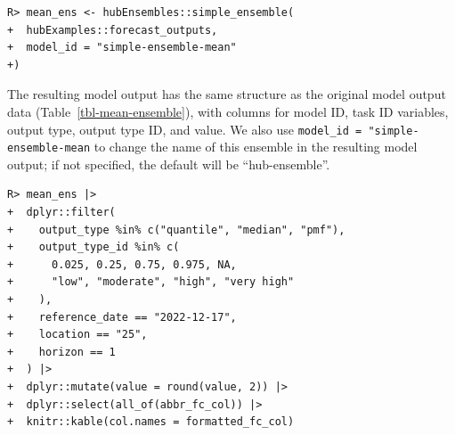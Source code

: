 \documentclass[
  article,
  shortnames,
  notitle]{jss}
\begin{document}
\begin{verbatim}
R> mean_ens <- hubEnsembles::simple_ensemble(
+  hubExamples::forecast_outputs,
+  model_id = "simple-ensemble-mean"
+)
\end{verbatim}

The resulting model output has the same structure as the original model
output data (Table~\ref{tbl-mean-ensemble}), with columns for model ID,
task ID variables, output type, output type ID, and value. We also use
\texttt{model\_id\ =\ "simple-ensemble-mean} to change the name of this
ensemble in the resulting model output; if not specified, the default
will be ``hub-ensemble''.

\begin{verbatim}
R> mean_ens |>
+  dplyr::filter(
+    output_type %in% c("quantile", "median", "pmf"),
+    output_type_id %in% c(
+      0.025, 0.25, 0.75, 0.975, NA,
+      "low", "moderate", "high", "very high"
+    ),
+    reference_date == "2022-12-17",
+    location == "25",
+    horizon == 1
+  ) |>
+  dplyr::mutate(value = round(value, 2)) |>
+  dplyr::select(all_of(abbr_fc_col)) |>
+  knitr::kable(col.names = formatted_fc_col)
\end{verbatim}
\end{document}
